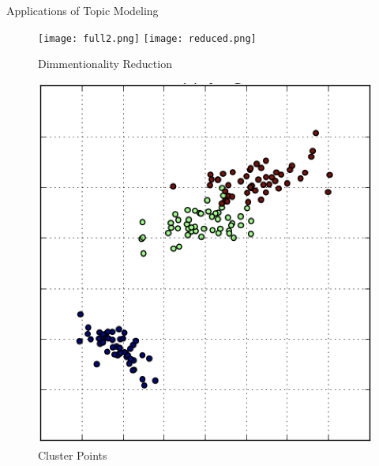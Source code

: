 \documentclass[10pt]{beamer}
\begin{document}
\begin{frame}{Applications of Topic Modeling}

  \begin{multicols}{3}

  \begin{figure}
  \texttt{[image: full2.png]}
  \texttt{[image: reduced.png]}
  \caption{Dimmentionality Reduction}
  \end{figure}

  \columnbreak

  \hfill
    \begin{figure}
  \includegraphics[width=\columnwidth]{cluster.png}
  \caption{Cluster Points}
  \end{figure}

    \columnbreak


\end{multicols}
\end{frame}
\end{document}
